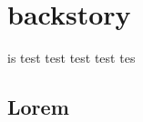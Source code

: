 \chapter{\Name{} backstory}
\label{background}

 is test test test test tes
\lipsum[1]
\section*{Lorem}
\lipsum[3-5]